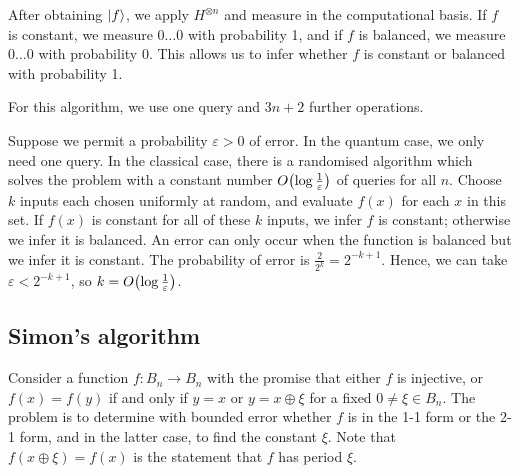 After obtaining \( \ket{f} \), we apply \( H^{\otimes n} \) and measure in the computational basis.
If \( f \) is constant, we measure \( 0\dots 0 \) with probability 1, and if \( f \) is balanced, we measure \( 0\dots 0 \) with probability 0.
This allows us to infer whether \( f \) is constant or balanced with probability 1.
\begin{center}
    \leavevmode
\end{center}
For this algorithm, we use one query and \( 3n+2 \) further operations.

Suppose we permit a probability \( \varepsilon > 0 \) of error.
In the quantum case, we only need one query.
In the classical case, there is a randomised algorithm which solves the problem with a constant number \( O\qty(\log \frac{1}{\varepsilon}) \) of queries for all \( n \).
Choose \( k \) inputs each chosen uniformly at random, and evaluate \( f(x) \) for each \( x \) in this set.
If \( f(x) \) is constant for all of these \( k \) inputs, we infer \( f \) is constant; otherwise we infer it is balanced.
An error can only occur when the function is balanced but we infer it is constant.
The probability of error is \( \frac{2}{2^k} = 2^{-k+1} \).
Hence, we can take \( \varepsilon < 2^{-k+1} \), so \( k = O\qty(\log \frac{1}{\varepsilon}) \).

\subsection{Simon's algorithm}
Consider a function \( f \colon B_n \to B_n \) with the promise that either \( f \) is injective, or \( f(x) = f(y) \) if and only if \( y = x \) or \( y = x \oplus \xi \) for a fixed \( 0 \neq \xi \in B_n \).
The problem is to determine with bounded error whether \( f \) is in the 1-1 form or the 2-1 form, and in the latter case, to find the constant \( \xi \).
Note that \( f(x \oplus \xi) = f(x) \) is the statement that \( f \) has period \( \xi \).

